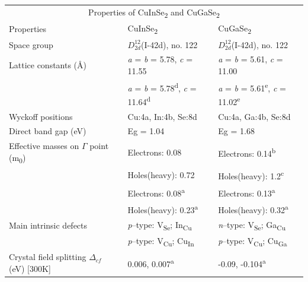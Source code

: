 \documentclass[a4paper, 12pt, titlepage,oneside,drop]{kthesis}
\begin{document}
\vspace{10cm}

\begin {table}[!htb]
\centering
\begin{tabular}{l l l}  
\toprule
\toprule
\multicolumn{3}{c}{\large Properties of CuInSe\textsubscript{2} and CuGaSe\textsubscript{2}} \\  
\cellcolor{blue!25} Properties & \cellcolor{blue!25} CuInSe\textsubscript{2} & \cellcolor{blue!25} CuGaSe\textsubscript{2} \\ 

Space group & $D_{2d}^{12}$(I-42d), no. 122 & $D_{2d}^{12}$(I-42d), no. 122 \\ 
\rowcolor[gray]{0.9}
Lattice constants (Å) & \textit{a} = \textit{b} = 5.78, \textit{c} = 11.55 & \textit{a} = \textit{b} = 5.61, \textit{c} = 11.00 \\ 
                      & \textit{a} = \textit{b} = 5.78\textsuperscript{d}, \textit{c} = 11.64\textsuperscript{d} & \textit{a} = \textit{b} = 5.61\textsuperscript{e}, \textit{c} = 11.02\textsuperscript{e} \\ 
Wyckoff positions & Cu:4a, In:4b, Se:8d & Cu:4a, Ga:4b, Se:8d \\ 
\rowcolor[gray]{0.9}
Direct band gap (eV) & Eg = 1.04 & Eg = 1.68 \\ 
Effective masses on $\Gamma$ point (m\textsubscript{0}) & Electrons: 0.08& Electrons: 0.14\textsuperscript{b} \\ 
                                      & Holes(heavy): 0.72& Holes(heavy): 1.2\textsuperscript{c} \\ 
                                      & Electrons: 0.08\textsuperscript{a} & Electrons: 0.13\textsuperscript{a}\\
                                     & Holes(heavy): 0.23\textsuperscript{a} & Holes(heavy): 0.32\textsuperscript{a} \\ 
\rowcolor[gray]{0.9}
Main intrinsic defects & \textit{p}--type: V\textsubscript{Se}; In\textsubscript{Cu}&  \textit{n}--type: V\textsubscript{Se}; Ga\textsubscript{Cu}\\
\rowcolor[gray]{0.9} & \textit{p}--type:  V\textsubscript{Cu}; Cu\textsubscript{In} & \textit{p}--type: V\textsubscript{Cu}; Cu\textsubscript{Ga}  \\  
Crystal field splitting $\Delta_{cf}$ (eV) [300K] & 0.006, 0.007\textsuperscript{a} & -0.09, -0.104\textsuperscript{a} \\ 

\end{tabular}
\end{table}
\end{document}
